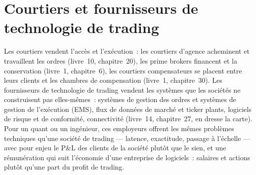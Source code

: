 \begin{omfigure}

\label{fig:in:exchanges-brokers-vendors-and-regulators-as-employers:perhead}
\end{omfigure}

\section{Courtiers et fournisseurs de technologie de trading}

Les courtiers vendent l'accès et l'exécution~: les courtiers d'agence acheminent et travaillent les ordres (livre~10, chapitre~20), les prime brokers financent et
la conservation (livre~1, chapitre~6), les courtiers compensateurs se placent entre leurs clients et les chambres de compensation (livre~1, chapitre~30).
Les fournisseurs de technologie de trading vendent les systèmes que les sociétés ne construisent pas elles-mêmes~: systèmes de gestion des ordres et systèmes de gestion de l'exécution
(EMS), flux de données de marché et ticker plants, logiciels de risque et de conformité, connectivité (livre~14, chapitre~27, en dresse
la carte). Pour un quant ou un ingénieur, ces employeurs offrent les mêmes problèmes techniques qu'une société de trading --- latence,
exactitude, passage à l'échelle --- avec pour enjeu le P\&L des clients de la société plutôt que le sien, et une rémunération
qui suit l'économie d'une entreprise de logiciels~: salaires et actions plutôt qu'une part du profit de trading.

